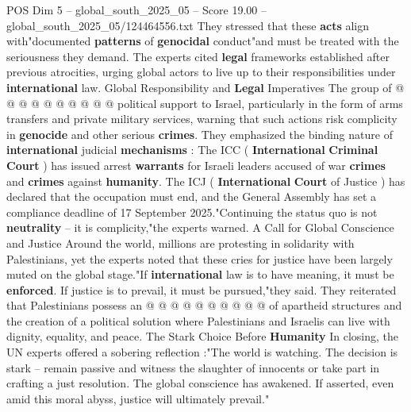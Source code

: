 \begin{textsample}{POS Dim 5 – global\_south\_2025\_05 – Score 19.00 – global\_south\_2025\_05/124464556.txt}
They stressed that these \textbf{acts} align with"documented \textbf{patterns} of \textbf{genocidal} conduct"and must be treated with the seriousness they demand.
The experts cited \textbf{legal} frameworks established after previous atrocities, urging global actors to live up to their responsibilities under \textbf{international} law.
Global Responsibility and \textbf{Legal} Imperatives The group of @ @ @ @ @ @ @ @ @ @ political support to Israel, particularly in the form of arms transfers and private military services, warning that such actions risk complicity in \textbf{genocide} and other serious \textbf{crimes}.
They emphasized the binding nature of \textbf{international} judicial \textbf{mechanisms} : The ICC ( \textbf{International} \textbf{Criminal} \textbf{Court} ) has issued arrest \textbf{warrants} for Israeli leaders accused of war \textbf{crimes} and \textbf{crimes} against \textbf{humanity}.
The ICJ ( \textbf{International} \textbf{Court} of Justice ) has declared that the occupation must end, and the General Assembly has set a compliance deadline of 17 September 2025."Continuing the status quo is not \textbf{neutrality} -- it is complicity,"the experts warned.
A Call for Global Conscience and Justice Around the world, millions are protesting in solidarity with Palestinians, yet the experts noted that these cries for justice have been largely muted on the global stage."If \textbf{international} law is to have meaning, it must be \textbf{enforced}.
If justice is to prevail, it must be pursued,"they said.
They reiterated that Palestinians possess an @ @ @ @ @ @ @ @ @ @ of apartheid structures and the creation of a political solution where Palestinians and Israelis can live with dignity, equality, and peace.
The Stark Choice Before \textbf{Humanity} In closing, the UN experts offered a sobering reflection :"The world is watching.
The decision is stark -- remain passive and witness the slaughter of innocents or take part in crafting a just resolution.
The global conscience has awakened.
If asserted, even amid this moral abyss, justice will ultimately prevail."

\end{textsample}

